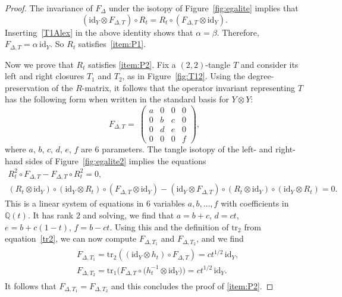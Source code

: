 \documentclass[pdftex]{sigma}
\numberwithin{equation}{section}
\theoremstyle{definition}
\begin{document}
\begin{proof}
The invariance of $F_\Delta$ under the isotopy of
Figure~\ref{fig:egalite} implies that
\begin{equation*}
(\mathrm{id}_Y \otimes F_{\Delta,T}) \circ R_{t} =
R_{t} \circ (F_{\Delta,T} \otimes \mathrm{id}_Y) .
\end{equation*}
Inserting~\eqref{T1Alex} in the above identity shows that $\alpha = \beta$. Therefore,
$ F_{\Delta,T} = \alpha\,\mathrm{id}_Y$. So $R_{t}$ satisfies~\eqref{item:P1}.

Now we prove that $R_{t}$ satisfies \eqref{item:P2}. Fix a $(2,2)$-tangle $T$
and consider its left and right closures $T_1$ and $T_2$, as in
Figure~\ref{fig:T12}. Using the degree-preservation of the $R$-matrix, it follows
that the operator invariant representing $T$ has the following form when
written in the standard basis for $Y \otimes Y$:
\[
F_{\Delta,T}=~\begin{pmatrix}
a & 0 & 0 & 0 \\
0 & b & c & 0 \\
0 & d & e & 0 \\
0 & 0 & 0 & f
\end{pmatrix},
\]
where $a$, $b$, $c$, $d$, $e$, $f$ are $6$ parameters. The tangle isotopy of
the left- and right-hand sides of Figure~\ref{fig:egalite2} implies the equations
\begin{gather*}%
 R_t^2 \circ F_{\Delta,T} - F_{\Delta,T} \circ R_t^2 = 0 ,\\
 (R_t \otimes \text{id}_Y) \circ (\text{id}_Y \otimes R_t) \circ
( F_{\Delta,T} \otimes \text{id}_Y) - (\text{id}_Y \otimes F_{\Delta,T})
\circ (R_t \otimes \text{id}_Y) \circ (\text{id}_Y \otimes R_t) = 0 .
\end{gather*}
This is a linear system of equations in $6$ variables $a,b,\dots,f$ with
coefficients in $\mathbb{Q}(t)$. It has rank $2$ and solving, we find that
$a = b + c$, $d = c t$, $e = b + c (1-t)$, $f = b - c t$.
Using this and the definition of $\mathrm{tr}_2$ from equation~\eqref{tr2}, we can now
compute $F_{\Delta,T_1}$ and $F_{\Delta,T_2}$, and we find
\begin{gather*}
\begin{split}
& F_{\Delta,T_1} =
 \mathrm{tr}_{2} ((\mathrm{id}_Y \otimes h_t) \circ F_{\Delta,T})
= c t^{1/2}\,\mathrm{id}_Y, \\
& F_{\Delta,T_2} = \mathrm{tr}_{1} \bigl(F_{\Delta,T}
\circ \bigl(h_t^{-1} \otimes \mathrm{id}_Y\bigr)\bigr) = c t^{1/2}\,\mathrm{id}_Y.
\end{split}
\end{gather*}
It follows that $F_{\Delta,T_1}=F_{\Delta,T_2}$ and this
concludes the proof of \eqref{item:P2}.
\end{proof}
\end{document}
